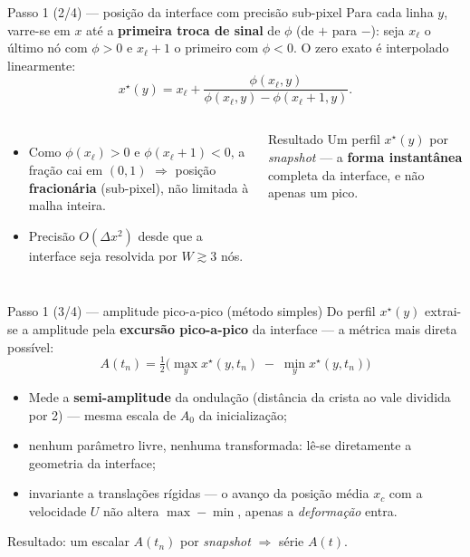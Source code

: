 \documentclass[aspectratio=169,11pt]{beamer}
\begin{document}
\begin{frame}{Passo 1 (2/4) — posição da interface com precisão sub-pixel}
  Para cada linha $y$, varre-se em $x$ até a \textbf{primeira troca de sinal}
  de $\phi$ (de $+$ para $-$): seja $x_\ell$ o último nó com $\phi>0$ e
  $x_\ell+1$ o primeiro com $\phi<0$. O zero exato é interpolado linearmente:
  \begin{equation*}
    x^\star(y) = x_\ell + \frac{\phi(x_\ell,y)}{\phi(x_\ell,y)-\phi(x_\ell+1,y)}.
  \end{equation*}
  \begin{columns}[T]
    \begin{itemize}
      \item Como $\phi(x_\ell)>0$ e $\phi(x_\ell+1)<0$, a fração cai em
            $(0,1)$ $\Rightarrow$ posição \textbf{fracionária} (sub-pixel),
            não limitada à malha inteira.
      \item Precisão $O(\Delta x^2)$ desde que a interface seja resolvida
            por $W\gtrsim 3$ nós.
    \end{itemize}
    \begin{block}{Resultado}
      Um perfil $x^\star(y)$ por \emph{snapshot} — a \textbf{forma instantânea}
      completa da interface, e não apenas um pico.
    \end{block}
  \end{columns}
\end{frame}

\begin{frame}{Passo 1 (3/4) — amplitude pico-a-pico (método simples)}
  Do perfil $x^\star(y)$ extrai-se a amplitude pela \textbf{excursão
  pico-a-pico} da interface — a métrica mais direta possível:
  \begin{equation*}
    \boxed{\;A(t_n) = \tfrac{1}{2}\Big(\max_y x^\star(y,t_n)
      \;-\; \min_y x^\star(y,t_n)\Big)\;}
  \end{equation*}
  \begin{itemize}
    \item Mede a \textbf{semi-amplitude} da ondulação (distância da crista ao
          vale dividida por 2) — mesma escala de $A_0$ da inicialização;
    \item nenhum parâmetro livre, nenhuma transformada: lê-se diretamente a
          geometria da interface;
    \item invariante a translações rígidas — o avanço da posição média $x_c$
          com a velocidade $U$ não altera $\max-\min$, apenas a \emph{deformação}
          entra.
  \end{itemize}
  \begin{center}\footnotesize
    Resultado: um escalar $A(t_n)$ por \emph{snapshot} $\Rightarrow$ série $A(t)$.
  \end{center}
\end{frame}
\end{document}
